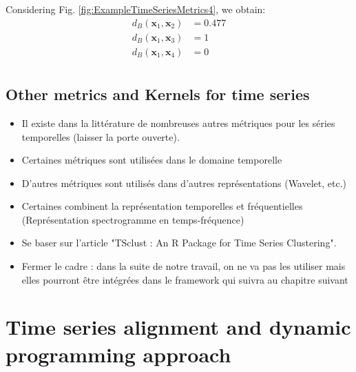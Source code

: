 \noindent Considering Fig. \ref{fig:ExampleTimeSeriesMetrics4}, we obtain:
\begin{align*}
d_B(\textbf{x}_1,\textbf{x}_2) &= 0.477 \\  
d_B(\textbf{x}_1,\textbf{x}_3) &= 1 \\  
d_B(\textbf{x}_1,\textbf{x}_4) &= 0 \\ 
\label{key}
\end{align*}  

\subsection{Other metrics and Kernels for time series}
\begin{itemize}
	\item Il existe dans la littérature de nombreuses autres métriques pour les séries temporelles (laisser la porte ouverte).
	\item Certaines métriques sont utilisées dans le domaine temporelle
	\item D'autres métriques sont utilisés dans d'autres représentations (Wavelet, etc.)
	\item Certaines combinent la représentation temporelles et fréquentielles (Représentation spectrogramme en temps-fréquence)
	\item Se baser sur l'article "TSclust : An R Package for Time Series Clustering".
	\item Fermer le cadre : dans la suite de notre travail, on ne va pas les utiliser mais elles pourront être intégrées dans le framework qui suivra au chapitre suivant
\end{itemize}


\section{Time series alignment and dynamic programming approach}

